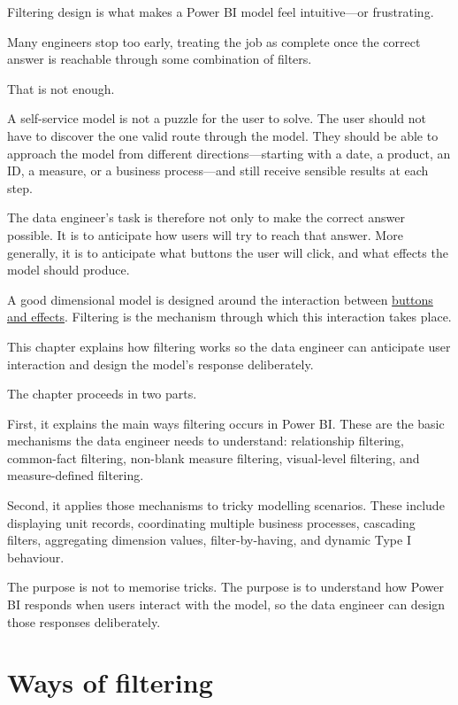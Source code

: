 \documentclass[10pt,openany,10pt]{book}
\begin{document}
Filtering design is what makes a Power BI model feel intuitive---or
frustrating.

Many engineers stop too early, treating the job as complete once the
correct answer is reachable through some combination of filters.

That is not enough.

A self-service model is not a puzzle for the user to solve. The user
should not have to discover the one valid route through the model. They
should be able to approach the model from different
directions---starting with a date, a product, an ID, a measure, or a
business process---and still receive sensible results at each step.

The data engineer's task is therefore not only to make the correct
answer possible. It is to anticipate how users will try to reach that
answer. More generally, it is to anticipate what buttons the user will
click, and what effects the model should produce.

A good dimensional model is designed around the interaction between
\hyperref[docs-presenting-insights-dimensional-modelling-for-ux]{buttons
and effects}. Filtering is the mechanism through which this interaction
takes place.

This chapter explains how filtering works so the data engineer can
anticipate user interaction and design the model's response
deliberately.

The chapter proceeds in two parts.

First, it explains the main ways filtering occurs in Power BI. These are
the basic mechanisms the data engineer needs to understand: relationship
filtering, common-fact filtering, non-blank measure filtering,
visual-level filtering, and measure-defined filtering.

Second, it applies those mechanisms to tricky modelling scenarios. These
include displaying unit records, coordinating multiple business
processes, cascading filters, aggregating dimension values,
filter-by-having, and dynamic Type I behaviour.

The purpose is not to memorise tricks. The purpose is to understand how
Power BI responds when users interact with the model, so the data
engineer can design those responses deliberately.

\section{Ways of filtering}\label{ways-of-filtering}
\end{document}
